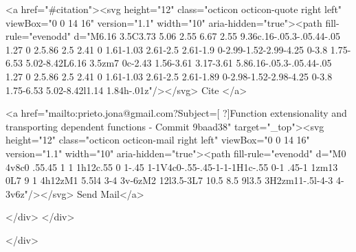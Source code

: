       <a  href="#citation"><svg height="12" class="octicon octicon-quote right left" viewBox="0 0 14 16" version="1.1" width="10" aria-hidden="true"><path fill-rule="evenodd" d="M6.16 3.5C3.73 5.06 2.55 6.67 2.55 9.36c.16-.05.3-.05.44-.05 1.27 0 2.5.86 2.5 2.41 0 1.61-1.03 2.61-2.5 2.61-1.9 0-2.99-1.52-2.99-4.25 0-3.8 1.75-6.53 5.02-8.42L6.16 3.5zm7 0c-2.43 1.56-3.61 3.17-3.61 5.86.16-.05.3-.05.44-.05 1.27 0 2.5.86 2.5 2.41 0 1.61-1.03 2.61-2.5 2.61-1.89 0-2.98-1.52-2.98-4.25 0-3.8 1.75-6.53 5.02-8.42l1.14 1.84h-.01z"/></svg> Cite
      </a>

      <a href="mailto:prieto.jona@gmail.com?Subject=[ ?]Function extensionality and transporting dependent functions  - Commit 9baad38" target="_top"><svg height="12" class="octicon octicon-mail right left" viewBox="0 0 14 16" version="1.1" width="10" aria-hidden="true"><path fill-rule="evenodd" d="M0 4v8c0 .55.45 1 1 1h12c.55 0 1-.45 1-1V4c0-.55-.45-1-1-1H1c-.55 0-1 .45-1 1zm13 0L7 9 1 4h12zM1 5.5l4 3-4 3v-6zM2 12l3.5-3L7 10.5 8.5 9l3.5 3H2zm11-.5l-4-3 4-3v6z"/></svg> Send Mail</a>

    </div>
  </div>

</div>




